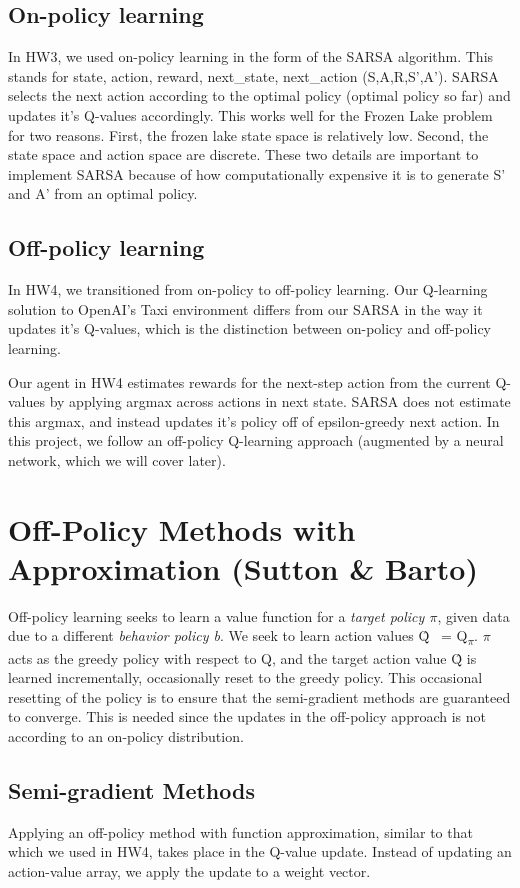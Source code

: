 \documentclass[conference]{IEEEtran}
\begin{document}
\subsection{On-policy learning}
In HW3, we used on-policy learning in the form of the SARSA algorithm. This stands for state, action, reward, next\_state, next\_action (S,A,R,S',A'). SARSA selects the next action according to the optimal policy (optimal policy so far) and updates it's Q-values accordingly. This works well for the Frozen Lake problem for two reasons. First, the frozen lake state space is relatively low. Second, the state space and action space are discrete. These two details are important to implement SARSA because of how computationally expensive it is to generate S' and A' from an optimal policy.

\subsection{Off-policy learning}
In HW4, we transitioned from on-policy to off-policy learning. Our Q-learning solution to OpenAI's Taxi environment differs from our SARSA in the way it updates it's Q-values, which is the distinction between on-policy and off-policy learning.

Our agent in HW4 estimates rewards for the next-step action from the current Q-values by applying argmax across actions in next state. SARSA does not estimate this argmax, and instead updates it's policy off of epsilon-greedy next action. In this project, we follow an off-policy Q-learning approach (augmented by a neural network, which we will cover later).

\section{Off-Policy Methods with Approximation (Sutton \& Barto)}
Off-policy learning seeks to learn a value function for a \textit{target policy $\pi$}, given data due to a different \textit{behavior policy b}. We seek to learn action values \^Q ~= Q\textsubscript{$\pi$}. $\pi$ acts as the greedy policy with respect to Q, and the target action value \^Q is learned incrementally, occasionally reset to the greedy policy. This occasional resetting of the policy is to ensure that the semi-gradient methods are guaranteed to converge. This is needed since the updates in the off-policy approach is not according to an on-policy distribution.

\subsection{Semi-gradient Methods}
Applying an off-policy method with function approximation, similar to that which we used in HW4, takes place in the Q-value update. Instead of updating an action-value array, we apply the update to a weight vector.
\end{document}
